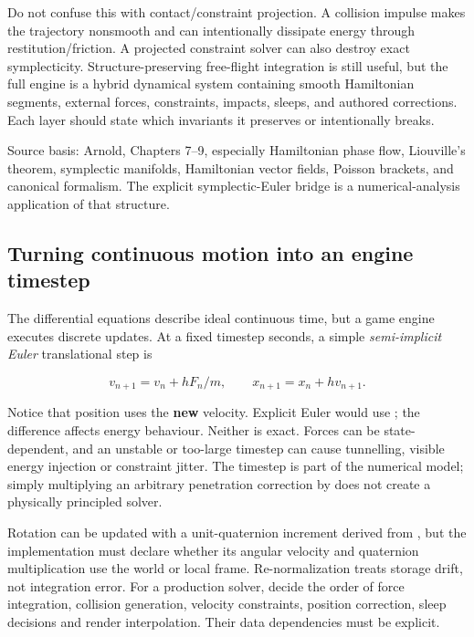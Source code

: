 Do not confuse this with contact/constraint projection. A collision impulse makes the trajectory nonsmooth and can intentionally dissipate energy through restitution/friction. A projected constraint solver can also destroy exact symplecticity. Structure-preserving free-flight integration is still useful, but the full engine is a hybrid dynamical system containing smooth Hamiltonian segments, external forces, constraints, impacts, sleeps, and authored corrections. Each layer should state which invariants it preserves or intentionally breaks.

Source basis: Arnold, Chapters 7--9, especially Hamiltonian phase flow, Liouville's theorem, symplectic manifolds, Hamiltonian vector fields, Poisson brackets, and canonical formalism. The explicit symplectic-Euler bridge is a numerical-analysis application of that structure.

\subsection{Turning continuous motion into an engine timestep}\label{06-engine-ii-ch033-turning-continuous-motion-into-an-engine-timestep}

\hypertarget{06-engine-ii-ch033-turning-continuous-motion-into-an-engine-timestep}{}

The differential equations describe ideal continuous time, but a game engine executes discrete updates. At a fixed timestep  seconds, a simple \emph{semi-implicit Euler} translational step is

\[
v_{n+1}=v_n+h F_n/m,\qquad x_{n+1}=x_n+h v_{n+1}.
\]

Notice that position uses the \textbf{new} velocity. Explicit Euler would use ; the difference affects energy behaviour. Neither is exact. Forces can be state-dependent, and an unstable or too-large timestep can cause tunnelling, visible energy injection or constraint jitter. The timestep is part of the numerical model; simply multiplying an arbitrary penetration correction by  does not create a physically principled solver.

Rotation can be updated with a unit-quaternion increment derived from , but the implementation must declare whether its angular velocity and quaternion multiplication use the world or local frame. Re-normalization treats storage drift, not integration error. For a production solver, decide the order of force integration, collision generation, velocity constraints, position correction, sleep decisions and render interpolation. Their data dependencies must be explicit.

